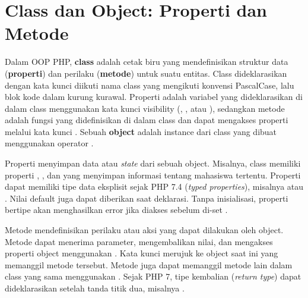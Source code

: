 ﻿\section{Class dan Object: Properti dan Metode}

Dalam OOP PHP, \textbf{class} adalah cetak biru yang mendefinisikan struktur data (\textbf{properti}) dan perilaku (\textbf{metode}) untuk suatu entitas. Class dideklarasikan dengan kata kunci  diikuti nama class yang mengikuti konvensi PascalCase, lalu blok kode dalam kurung kurawal. Properti adalah variabel yang dideklarasikan di dalam class menggunakan kata kunci visibility (, , atau ), sedangkan metode adalah fungsi yang didefinisikan di dalam class dan dapat mengakses properti melalui kata kunci . Sebuah \textbf{object} adalah instance dari class yang dibuat menggunakan operator  \cite{phpManual}.

Properti menyimpan data atau \textit{state} dari sebuah object. Misalnya, class  memiliki properti , , dan  yang menyimpan informasi tentang mahasiswa tertentu. Properti dapat memiliki tipe data eksplisit sejak PHP 7.4 (\textit{typed properties}), misalnya  atau . Nilai default juga dapat diberikan saat deklarasi. Tanpa inisialisasi, properti bertipe akan menghasilkan error jika diakses sebelum di-set \cite{phpRightWay}.

Metode mendefinisikan perilaku atau aksi yang dapat dilakukan oleh object. Metode dapat menerima parameter, mengembalikan nilai, dan mengakses properti object menggunakan . Kata kunci  merujuk ke object saat ini yang memanggil metode tersebut. Metode juga dapat memanggil metode lain dalam class yang sama menggunakan . Sejak PHP 7, tipe kembalian (\textit{return type}) dapat dideklarasikan setelah tanda titik dua, misalnya  \cite{phpManual}.


